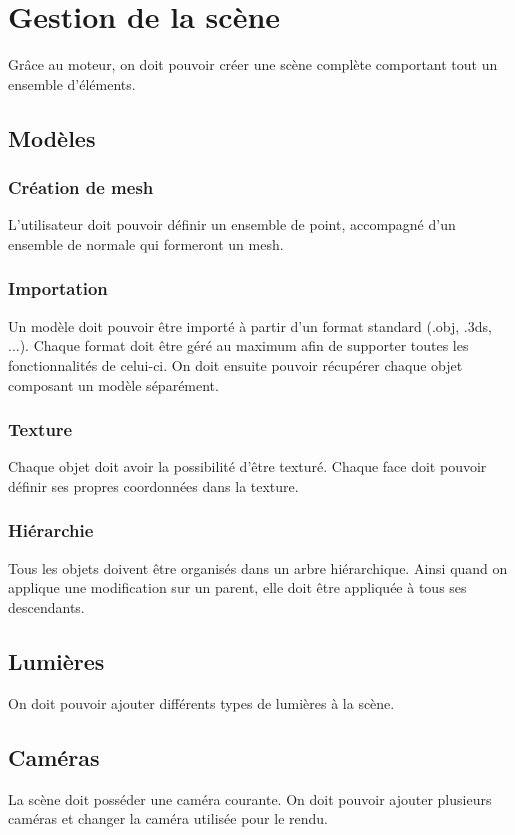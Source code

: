 \documentclass [a4 paper,11pt]{article}
\begin{document}
\section{Gestion de la scène}
Grâce au moteur, on doit pouvoir créer une scène complète comportant tout un ensemble d'éléments.
\subsection{Modèles}

\subsubsection*{Création de mesh}
L'utilisateur doit pouvoir définir un ensemble de point, accompagné d'un ensemble de normale qui formeront un mesh.
\subsubsection*{Importation}
Un modèle doit pouvoir être importé à partir d'un format standard (.obj, .3ds, ...).
Chaque format doit être géré au maximum afin de supporter toutes les fonctionnalités de celui-ci.
On doit ensuite pouvoir récupérer chaque objet composant un modèle séparément.
\subsubsection*{Texture}
Chaque objet doit avoir la possibilité d'être texturé.
Chaque face doit pouvoir définir ses propres coordonnées dans la texture.
\subsubsection*{Hiérarchie}
Tous les objets doivent être organisés dans un arbre hiérarchique.
Ainsi quand on applique une modification sur un parent, elle doit être appliquée à tous ses descendants.

\subsection{Lumières}
On doit pouvoir ajouter différents types de lumières à la scène.

\subsection{Caméras}
La scène doit posséder une caméra courante.
On doit pouvoir ajouter plusieurs caméras et changer la caméra utilisée pour le rendu.
\end{document}
